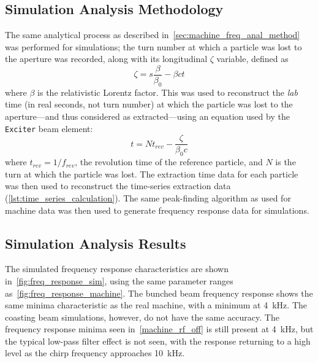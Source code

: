 \documentclass[11pt]{report}
\begin{document}
\subsection{Simulation Analysis Methodology}\label{sec:sim_analysis_method}

The same analytical process as described in~\autoref{sec:machine_freq_anal_method} was performed for simulations; the turn number at which a particle was lost to the aperture was recorded, along with its longitudinal $\zeta$ variable, defined as
\begin{equation}
  \zeta = s \frac{\beta}{\beta_0} - \beta c t
\end{equation}
where $\beta$ is the relativistic Lorentz factor. This was used to reconstruct the \textit{lab} time (in real seconds, not turn number) at which the particle was lost to the aperture---and thus considered as extracted---using an equation used by the \verb|Exciter| beam element:
\begin{equation}
  t = N t_{rev} - \frac\zeta{\beta_0 c}
\end{equation}
where $t_{rev}=1/f_{rev}$, the revolution time of the reference particle, and $N$ is the turn at which the particle was lost. The extraction time data for each particle was then used to reconstruct the time-series extraction data (\autoref{lst:time_series_calculation}). The same peak-finding algorithm as used for machine data was then used to generate frequency response data for simulations.

\subsection{Simulation Analysis Results}
The simulated frequency response characteristics are shown in~\autoref{fig:freq_response_sim}, using the same parameter ranges as~\autoref{fig:freq_response_machine}. The bunched beam frequency response shows the same minima characteristic as the real machine, with a minimum at \qty{4}{\kilo\hertz}. The coasting beam simulations, however, do not have the same accuracy. The frequency response minima seen in~\autoref{machine_rf_off} is still present at \qty{4}{\kilo\hertz}, but the typical low-pass filter effect is not seen, with the response returning to a high level as the chirp frequency approaches \qty{10}{\kilo\hertz}.
\end{document}
